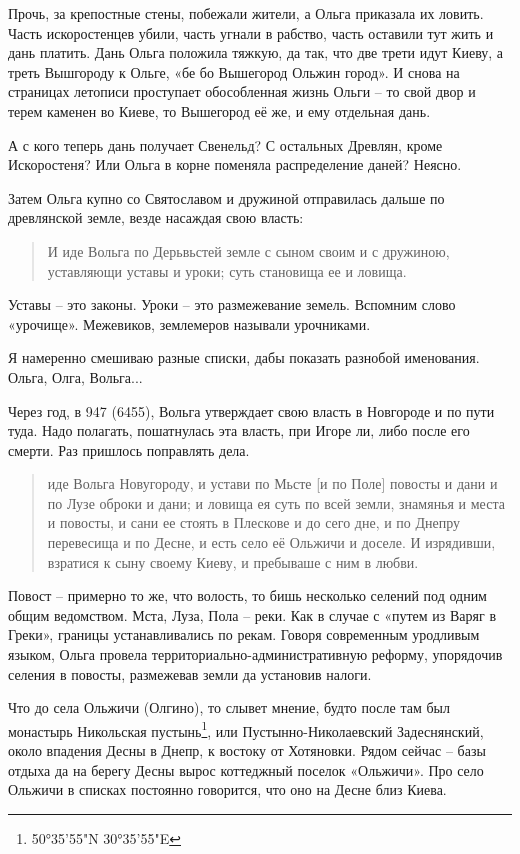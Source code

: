 Прочь, за крепостные стены, побежали жители, а Ольга приказала их ловить. Часть искоростенцев убили, часть угнали в рабство, часть оставили тут жить и дань платить. Дань Ольга положила тяжкую, да так, что две трети идут Киеву, а треть Вышгороду к Ольге, «бе бо Вышегород Ольжин город». И снова на страницах летописи проступает обособленная жизнь Ольги – то свой двор и терем каменен во Киеве, то Вышегород её же, и ему отдельная дань.

А с кого теперь дань получает Свенельд? С остальных Древлян, кроме Искоростеня? Или Ольга в корне поменяла распределение даней? Неясно.

Затем Ольга купно со Святославом и дружиной отправилась дальше по древлянской земле, везде насаждая свою власть:

\begin{quotation}
И иде Вольга по Дерьвьстей земле с сыном своим и с дружиною, уставляющи уставы и уроки; суть становища ее и ловища.
\end{quotation}

Уставы – это законы. Уроки – это размежевание земель. Вспомним слово «урочище». Межевиков, землемеров называли урочниками.

Я намеренно смешиваю разные списки, дабы показать разнобой именования. Ольга, Олга, Вольга...

Через год, в 947 (6455), Вольга утверждает свою власть в Новгороде и по пути туда. Надо полагать, пошатнулась эта власть, при Игоре ли, либо после его смерти. Раз пришлось поправлять дела.

\begin{quotation}
иде Вольга Новугороду, и устави по Мьсте [и по Поле] повосты и дани и по Лузе оброки и дани; и ловища ея суть по всей земли, знамянья и места и повосты, и сани ее стоять в Плескове и до сего дне, и по Днепру перевесища и по Десне, и есть село её Ольжичи и доселе. И изрядивши, взратися к сыну своему Киеву, и пребываше с ним в любви.
\end{quotation}

Повост – примерно то же, что волость, то бишь несколько селений под одним общим ведомством. Мста, Луза, Пола – реки. Как в случае с «путем из Варяг в Греки», границы устанавливались по рекам. Говоря современным уродливым языком, Ольга провела территориально-административную реформу, упорядочив селения в повосты, размежевав земли да установив налоги.

Что до села Ольжичи (Олгино), то слывет мнение, будто после там был монастырь Никольская пустынь\footnote{50°35'55"N 30°35'55"E}, или Пустынно-Николаевский Задеснянский, около впадения Десны в Днепр, к востоку от Хотяновки. Рядом сейчас – базы отдыха да на берегу Десны вырос коттеджный поселок «Ольжичи». Про село Ольжичи в списках постоянно говорится, что оно на Десне близ Киева.

